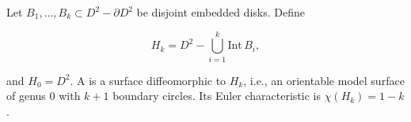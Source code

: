 Let $B_1, \ldots, B_k \subset D^2 - \partial D^2$ be disjoint embedded disks. Define

$$H_k = D^2 - \bigcup_{i=1}^{k} \text{Int}\, B_i,$$

and $H_0 = D^2$. A  is a surface diffeomorphic to $H_k$, i.e., an orientable model surface of genus $0$ with $k + 1$ boundary circles. Its Euler characteristic is $\chi(H_k) = 1 - k$.
